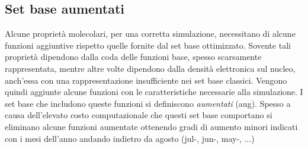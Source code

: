 \documentclass[oneside]{amsbook}
\numberwithin{section}{chapter}
\numberwithin{equation}{section}
\numberwithin{figure}{section}
\begin{document}
\subsection{Set base aumentati}

Alcune proprietà molecolari, per una corretta simulazione, necessitano di alcune funzioni aggiuntive rispetto quelle fornite dal set base ottimizzato. Sovente tali proprietà dipendono dalla coda delle funzioni base, spesso scarsamente rappresentata, mentre altre volte dipendono dalla densità elettronica sul nucleo, anch'essa con una rappresentazione insufficiente nei set base classici. Vengono quindi aggiunte alcune funzioni con le caratteristiche necessarie alla simulazione.
I set base che includono queste funzioni si definiscono \emph{aumentati} (aug). Spesso  a causa dell'elevato costo computazionale che questi set base comportano si eliminano alcune funzioni aumentate ottenendo gradi di aumento minori indicati con i mesi dell'anno andando indietro da agosto (jul-, jun-,  may-, ...)
\end{document}
